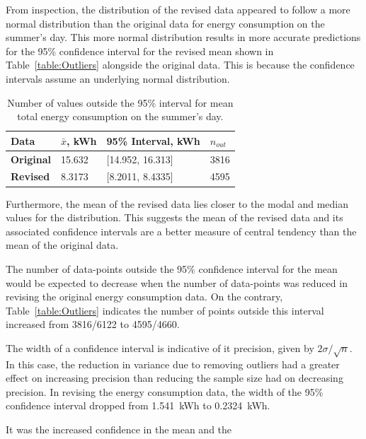 \documentclass[a4paper,10pt,twocolumn]{article}
\begin{document}
From inspection, the distribution of the revised data appeared to follow a more 
normal distribution than the original data for energy consumption on the 
summer's day. This more normal distribution results in more accurate 
predictions for the 95\% confidence interval for the revised mean shown in 
Table~\vref{table:Outliers} alongside the original data. This is because the 
confidence intervals assume an underlying normal distribution.

\begin{table}[h]
    \centering
    \begin{tabular}{llll}
        \toprule
        \textbf{Data} & $\bar{x}$, \tiny{kWh} & 95\% Interval, \tiny{kWh} & 
        $n_{out}$ \\
        \midrule
        \textbf{Original} & 15.632 & [14.952, 16.313] & 3816 \\
        \textbf{Revised}  & 8.3173 & [8.2011, 8.4335] & 4595 \\
        \bottomrule
    \end{tabular}
    \caption{Number of values outside the 95\% interval for mean total energy 
    consumption on the summer's day.}
    \label{table:Outliers}
\end{table}

Furthermore, the mean of the revised data lies closer to the modal and median 
values for the distribution. This suggests the mean of the revised data and its 
associated confidence intervals are a better measure of central tendency than 
the mean of the original data.

The number of data-points outside the 95\% confidence interval for the mean 
would be expected to decrease when the number of data-points was reduced in 
revising the original energy consumption data. On the contrary, 
Table~\vref{table:Outliers} indicates the number of points outside this 
interval increased from 3816/6122 to 4595/4660.

The width of a confidence interval is indicative of it precision, given by 
$2\sigma/\sqrt{n}$. In this case, the reduction in variance due to removing 
outliers had a greater effect on increasing precision than reducing the sample 
size had on decreasing precision. In revising the energy consumption data, the 
width of the 95\% confidence interval dropped from 1.541~kWh to 0.2324~kWh.

It was the increased confidence in the mean and the 

\printbibliography

\clearpage
\end{document}
